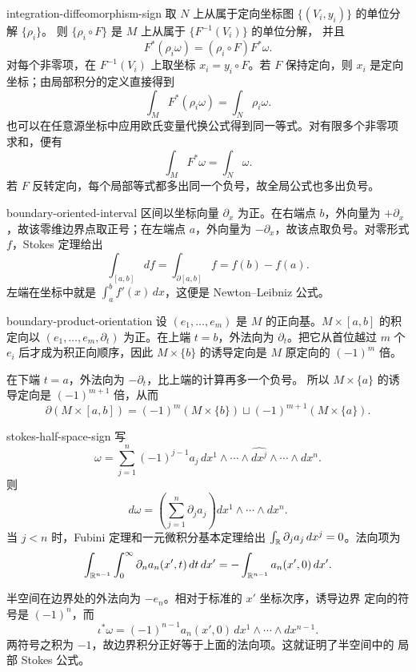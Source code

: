 \begin{solution}{integration-diffeomorphism-sign}
取 $N$ 上从属于定向坐标图 $\{(V_i,y_i)\}$ 的单位分解 $\{\rho_i\}$。
则 $\{\rho_i\circ F\}$ 是 $M$ 上从属于 $\{F^{-1}(V_i)\}$ 的单位分解，
并且
\[
 F^*(\rho_i\omega)=(\rho_i\circ F)F^*\omega.
\]
对每个非零项，在 $F^{-1}(V_i)$ 上取坐标 $x_i=y_i\circ F$。若 $F$
保持定向，则 $x_i$ 是定向坐标；由局部积分的定义直接得到
\[
 \int_MF^*(\rho_i\omega)=\int_N\rho_i\omega.
\]
也可以在任意源坐标中应用欧氏变量代换公式得到同一等式。对有限多个非零项
求和，便有
\[
 \int_MF^*\omega=\int_N\omega.
\]
若 $F$ 反转定向，每个局部等式都多出同一个负号，故全局公式也多出负号。
\end{solution}

\begin{solution}{boundary-oriented-interval}
区间以坐标向量 $\partial_x$ 为正。在右端点 $b$，外向量为
$+\partial_x$，故该零维边界点取正号；在左端点 $a$，外向量为
$-\partial_x$，故该点取负号。对零形式 $f$，Stokes 定理给出
\[
 \int_{[a,b]}df=\int_{\partial[a,b]}f=f(b)-f(a).
\]
左端在坐标中就是 $\int_a^bf'(x)\,dx$，这便是 Newton--Leibniz 公式。
\end{solution}

\begin{solution}{boundary-product-orientation}
设 $(e_1,\ldots,e_m)$ 是 $M$ 的正向基。$M\times[a,b]$ 的积定向以
$(e_1,\ldots,e_m,\partial_t)$ 为正。在上端 $t=b$，外法向为
$\partial_t$。把它从首位越过 $m$ 个 $e_i$ 后才成为积正向顺序，因此
$M\times\{b\}$ 的诱导定向是 $M$ 原定向的 $(-1)^m$ 倍。

在下端 $t=a$，外法向为 $-\partial_t$，比上端的计算再多一个负号。
所以 $M\times\{a\}$ 的诱导定向是 $(-1)^{m+1}$ 倍，从而
\[
 \partial(M\times[a,b])
 =(-1)^m(M\times\{b\})
 \sqcup(-1)^{m+1}(M\times\{a\}).
\]
\end{solution}

\begin{solution}{stokes-half-space-sign}
写
\[
 \omega=\sum_{j=1}^n(-1)^{j-1}a_j\,
 dx^1\wedge\cdots\wedge\widehat{dx^j}\wedge\cdots\wedge dx^n.
\]
则
\[
 d\omega=\left(\sum_{j=1}^n\partial_ja_j\right)
 dx^1\wedge\cdots\wedge dx^n.
\]
当 $j<n$ 时，Fubini 定理和一元微积分基本定理给出
$\int_{\mathbb{R}}\partial_ja_j\,dx^j=0$。法向项为
\[
 \int_{\mathbb{R}^{n-1}}\int_0^\infty
 \partial_na_n(x',t)\,dt\,dx'
 =-\int_{\mathbb{R}^{n-1}}a_n(x',0)\,dx'.
\]

半空间在边界处的外法向为 $-e_n$。相对于标准的 $x'$ 坐标次序，诱导边界
定向的符号是 $(-1)^n$，而
\[
 \iota^*\omega=(-1)^{n-1}a_n(x',0)\,
 dx^1\wedge\cdots\wedge dx^{n-1}.
\]
两符号之积为 $-1$，故边界积分正好等于上面的法向项。这就证明了半空间中的
局部 Stokes 公式。
\end{solution}

